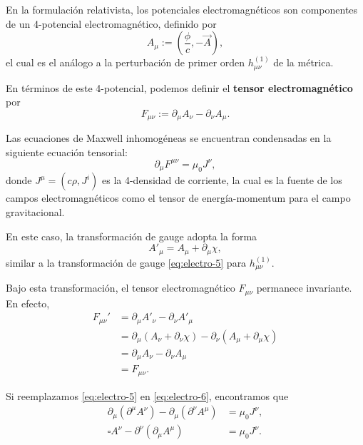 \documentclass[letterpaper,11pt]{article}
\begin{document}
En la formulación relativista, los potenciales electromagnéticos son componentes de un 4-potencial electromagnético, definido por
\begin{equation}
A_{\mu} := \left( \frac{\phi}{c}, - \vec{A} \right), \label{eq:electro-4}
\end{equation}
el cual es el análogo a la perturbación de primer orden $h_{\mu\nu}^{(1)}$ de la métrica.

En términos de este 4-potencial, podemos definir el \textbf{tensor electromagnético} por
\begin{equation}
F_{\mu\nu} := \partial_{\mu} A_{\nu} - \partial_{\nu} A_{\mu}. \label{eq:electro-5}
\end{equation}

Las ecuaciones de Maxwell inhomogéneas se encuentran condensadas en la siguiente ecuación tensorial:
\begin{equation}
\partial_{\mu} F^{\mu\nu} = \mu_0 J^{\nu}, \label{eq:electro-6}
\end{equation}
donde $J^{\mu} = (c\rho, J^{i})$ es la 4-densidad de corriente, la cual es la fuente de los campos electromagnéticos como el tensor de energía-momentum para el campo gravitacional.

En este caso, la transformación de gauge adopta la forma
\begin{equation}
A'_{\mu} = A_{\mu} + \partial_{\mu} \chi, \label{eq:electro-7}
\end{equation}
similar a la transformación de gauge \eqref{eq:electro-5} para $h_{\mu\nu}^{(1)}$.

Bajo esta transformación, el tensor electromagnético $F_{\mu\nu}$ permanece invariante. En efecto,
\begin{align}
F_{\mu\nu}' &= \partial_{\mu} A'_{\nu} - \partial_{\nu} A'_{\mu} \nonumber\\
&= \partial_{\mu}(A_{\nu} + \partial_{\nu} \chi) - \partial_{\nu}(A_{\mu} + \partial_{\mu}\chi) \nonumber\\
&= \partial_{\mu} A_{\nu} - \partial_{\nu} A_{\mu} \nonumber\\
&= F_{\mu\nu}. \label{eq:electro-8}
\end{align}

Si reemplazamos \eqref{eq:electro-5} en \eqref{eq:electro-6}, encontramos que 
\begin{align}
\partial_{\mu} \left( \partial^{\mu} A^{\nu}\right) - \partial_{\mu}\left(\partial^{\nu} A^{\mu} \right) &= \mu_0 J^{\nu}, \label{eq:electro-9}\\
\square A^{\nu} - \partial^{\nu}\left(\partial_{\mu} A^{\mu} \right) &= \mu_0 J^{\nu}. \label{eq:electro-10}
\end{align}
\end{document}
